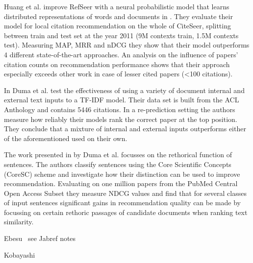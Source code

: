 Huang et al. improve RefSeer with a neural probabilistic model that learns distributed representations of words and documents in \cite{Huang2015}. They evaluate their model for local citation recommendation on the whole of CiteSeer, splitting between train and test set at the year 2011 (9M contexts train, 1.5M contexts test). Measuring MAP, MRR and nDCG they show that their model outperforms 4 different state-of-the-art approaches. An analysis on the influence of papers' citation counts on recommendation performance shows that their approach especially exceeds other work in case of lesser cited papers (<100 citations).

In \cite{Duma2014} Duma et al. test the effectiveness of using a variety of document internal and external text inputs to a TF-IDF model. Their data set is built from the ACL Anthology and contains 5446 citations. In a re-prediction setting the authors measure how reliably their models rank the correct paper at the top position. %
They conclude that a mixture of internal and external inputs outperforms either of the aforementioned used on their own.

The work presented in \cite{Duma2016} by Duma et al. focusses on the rethorical function of sentences. The authors classify sentences using the Core Scientific Concepts (CoreSC) scheme and investigate how their distinction can be used to improve recommendation. Evaluating on one million papers from the PubMed Central Open Access Subset they measure NDCG values and find that for several classes of input sentences significant gains in recommendation quality can be made by focussing on certain rethoric passages of candidate documents when ranking text similarity.

Ebesu~\cite{Ebesu2017} see Jabref notes

Kobayashi~\cite{Kobayashi2018}
